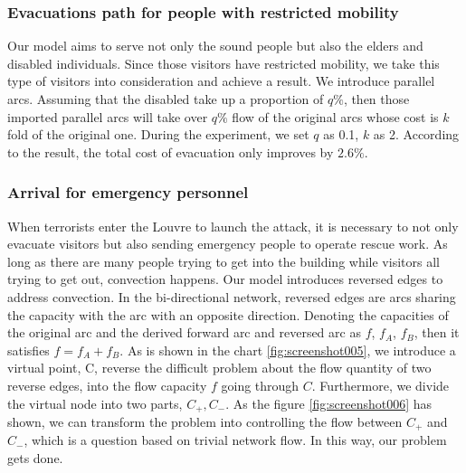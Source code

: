 \documentclass{mcmthesis}
\begin{document}
	\subsubsection{Evacuations path for people with restricted mobility}
	
	Our model aims to serve not only the sound people  but also the elders and disabled individuals. Since those visitors have restricted mobility, we take this type of visitors into consideration and achieve a result. We introduce parallel arcs. Assuming that the disabled take up a proportion of $q\%$, then those imported parallel arcs will take over $q\%$ flow of the original arcs whose cost is $k$ fold of the original one.
	During the experiment, we set $q$ as 0.1, $k$ as 2. According to the result, the total cost of evacuation only improves by $2.6\%$.
	
	\subsubsection{Arrival for emergency personnel}
	When terrorists enter the Louvre to launch the attack, it is necessary to not only evacuate visitors but also sending emergency people to operate rescue work.  As long as there are many people trying to get into the building while visitors all trying to get out, convection happens. Our model introduces reversed edges to address convection. In the bi-directional network, reversed edges are arcs sharing the capacity with the arc with an opposite direction. Denoting the capacities of the original arc and the derived forward arc and reversed arc as $f$, $f_A$, $f_B$, then it satisfies $f = f_A + f_B$. As is shown in the chart \ref{fig:screenshot005}, we introduce a virtual point, C, reverse the difficult problem about the flow quantity of two reverse edges, into the flow capacity $f$ going through $C$. Furthermore, we divide the virtual node into two parts, $C_{+}, C_{-}$. As the figure \ref{fig:screenshot006} has shown, we can transform the problem into controlling the flow between $C_{+}$ and $C_{-}$, which is a question based on trivial network flow. In this way, our problem gets done.
	
	
	\begin{figure} 
		\centering 
		\hspace{0.2in} 
	\end{figure}
\end{document}
